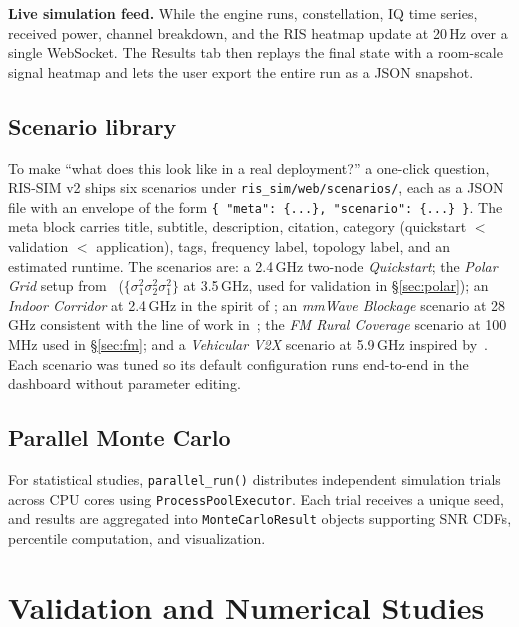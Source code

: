 \documentclass{article}
\begin{document}
\textbf{Live simulation feed.} While the engine runs, constellation, IQ time series, received power, channel breakdown, and the RIS heatmap update at 20\,Hz over a single WebSocket. The Results tab then replays the final state with a room-scale signal heatmap and lets the user export the entire run as a JSON snapshot.

\subsection{Scenario library}
\label{sec:scenarios}

To make ``what does this look like in a real deployment?'' a one-click question, RIS-SIM v2 ships six scenarios under \texttt{ris\_sim/web/scenarios/}, each as a JSON file with an envelope of the form \texttt{\{ "meta": \{...\}, "scenario": \{...\} \}}. The meta block carries title, subtitle, description, citation, category (quickstart $<$ validation $<$ application), tags, frequency label, topology label, and an estimated runtime. The scenarios are: a 2.4\,GHz two-node \emph{Quickstart}; the \emph{Polar Grid} setup from~\cite{WCL2025} ($\{\sigma_1^2\sigma_2^2\sigma_1^2\}$ at 3.5\,GHz, used for validation in \S\ref{sec:polar}); an \emph{Indoor Corridor} at 2.4\,GHz in the spirit of \cite{Smart_Radio_Environments_Di_Renzo}; an \emph{mmWave Blockage} scenario at 28\,GHz consistent with the line of work in~\cite{SPM_RIS}; the \emph{FM Rural Coverage} scenario at 100\,MHz used in \S\ref{sec:fm}; and a \emph{Vehicular V2X} scenario at 5.9\,GHz inspired by~\cite{CoopeRIS}. Each scenario was tuned so its default configuration runs end-to-end in the dashboard without parameter editing.

\subsection{Parallel Monte Carlo}

For statistical studies, \texttt{parallel\_run()} distributes independent simulation trials across CPU cores using \texttt{ProcessPoolExecutor}. Each trial receives a unique seed, and results are aggregated into \texttt{MonteCarloResult} objects supporting SNR CDFs, percentile computation, and visualization.

\section{Validation and Numerical Studies}
\label{sec:numerical}
\end{document}
